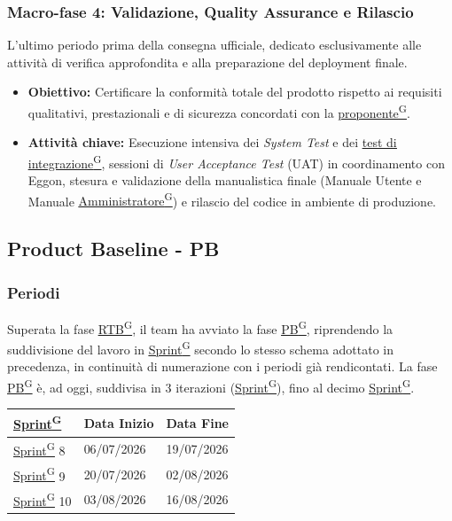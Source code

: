 \documentclass[a4paper,12pt]{article}
\providecommand{\glslink}[2]{\href{https://alittlebyte-19.github.io/Documentazione/glossario.html\#gls-#1}{\underline{#2}\textsuperscript{\scriptsize G}}}
\begin{document}
\subsubsection{Macro-fase 4: Validazione, Quality Assurance e Rilascio}
L'ultimo periodo prima della consegna ufficiale, dedicato esclusivamente alle attività di verifica approfondita e alla preparazione del deployment finale.
\begin{itemize}
    \item \textbf{Obiettivo:} Certificare la conformità totale del prodotto rispetto ai requisiti qualitativi, prestazionali e di sicurezza concordati con la \glslink{committente-proponente}{proponente}.
    \item \textbf{Attività chiave:} Esecuzione intensiva dei \textit{System Test} e dei \glslink{test-di-integrazione}{test di integrazione}, sessioni di \textit{User Acceptance Test} (UAT) in coordinamento con Eggon, stesura e validazione della manualistica finale (Manuale Utente e Manuale \glslink{amministratore}{Amministratore}) e rilascio del codice in ambiente di produzione.
\end{itemize}

\subsection{Product Baseline - PB}
\subsubsection{Periodi}
Superata la fase \glslink{rtb-requirements-and-technology-baseline}{RTB}, il team ha avviato la fase \glslink{pb-product-baseline}{PB}, riprendendo la suddivisione del lavoro in \glslink{sprint}{Sprint} secondo lo stesso schema adottato in precedenza, in continuità di numerazione con i periodi già rendicontati. La fase \glslink{pb-product-baseline}{PB} è, ad oggi, suddivisa in 3 iterazioni (\glslink{sprint}{Sprint}), fino al decimo \glslink{sprint}{Sprint}.
\label{sec:pb_periodi}
\begin{table}[H]
    \centering
    \renewcommand{\arraystretch}{1.5} %
    \begin{tabularx}{\textwidth}{|X|X|X|}
    \hline \rowcolor{Dandelion!50}
    \textbf{\glslink{sprint}{Sprint}} & \textbf{Data Inizio} & \textbf{Data Fine}\\
    \hline
    \glslink{sprint}{Sprint} 8 & 06/07/2026 & 19/07/2026\\
    \hline
    \glslink{sprint}{Sprint} 9 & 20/07/2026 & 02/08/2026\\
    \hline
    \glslink{sprint}{Sprint} 10 & 03/08/2026 & 16/08/2026\\
    \hline

    \end{tabularx}
\end{table}
\end{document}

